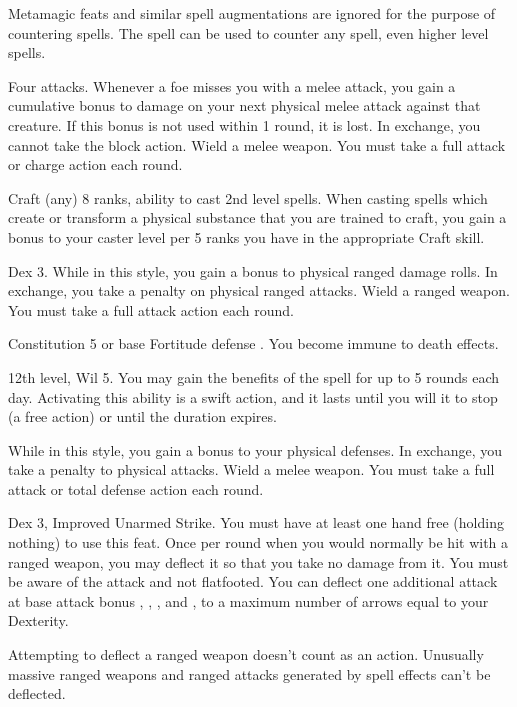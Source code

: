 Metamagic feats and similar spell augmentations are ignored for the purpose of countering spells.
The 
spell can be used to counter any spell, even higher level spells.

\featpre Four attacks.
\featben Whenever a foe misses you with a melee attack, you gain a cumulative  bonus to damage on your next physical melee attack against that creature.
If this bonus is not used within 1 round, it is lost.
In exchange, you cannot take the block action.
\stylereq Wield a melee weapon.
You must take a full attack or charge action each round.

\featpres Craft (any) 8 ranks, ability to cast 2nd level spells.
\featben When casting spells which create or transform a physical substance that you are trained to craft, you gain a  bonus to your caster level per 5 ranks you have in the appropriate Craft skill.

\featpres
Dex 3.
\featben While in this style, you gain a  bonus to physical ranged damage rolls.
In exchange, you take a  penalty on physical ranged attacks.
\stylereq Wield a ranged weapon.
You must take a full attack action each round.

\featpre Constitution 5 or base Fortitude defense .
\featben You become immune to death effects.

\featpre 12th level, Wil 5.
\featben You may gain the benefits of the 
spell for up to 5 rounds each day.
Activating this ability is a swift action, and it lasts until you will it to stop (a free action) or until the duration expires.

\featben While in this style, you gain a  bonus to your physical defenses.
In exchange, you take a  penalty to physical attacks.
\stylereq Wield a melee weapon.
You must take a full attack or total defense action each round.

\featpres
Dex 3, Improved Unarmed Strike.
\featben You must have at least one hand free (holding nothing) to use this feat.
Once per round when you would normally be hit with a ranged weapon, you may deflect it so that you take no damage from it.
You must be aware of the attack and not flatfooted.
You can deflect one additional attack at base attack bonus , , , and , to a maximum number of arrows equal to your Dexterity.
\par Attempting to deflect a ranged weapon doesn't count as an action.
Unusually massive ranged weapons and ranged attacks generated by spell effects can't be deflected.

